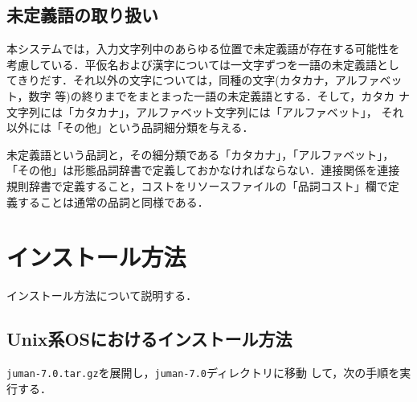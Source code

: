 \documentclass[a4j,titlepage]{jarticle}
\begin{document}
\subsection{未定義語の取り扱い}
\label{subsec:undef}

本システムでは，入力文字列中のあらゆる位置で未定義語が存在する可能性を
考慮している．平仮名および漢字については一文字ずつを一語の未定義語とし
てきりだす．それ以外の文字については，同種の文字(カタカナ，アルファベッ
ト，数字 等)の終りまでをまとまった一語の未定義語とする．そして，カタカ
ナ文字列には「カタカナ」，アルファベット文字列には「アルファベット」，
それ以外には「その他」という品詞細分類を与える．

未定義語という品詞と，その細分類である「カタカナ」，「アルファベット」，
「その他」は形態品詞辞書で定義しておかなければならない．連接関係を連接
規則辞書で定義すること，コストをリソースファイルの「品詞コスト」欄で定
義することは通常の品詞と同様である．


\section{インストール方法}\label{install}

インストール方法について説明する．

\subsection{Unix系OSにおけるインストール方法}

\texttt{juman-7.0.tar.gz}を展開し，\texttt{juman-7.0}ディレクトリに移動
して，次の手順を実行する．
\end{document}
